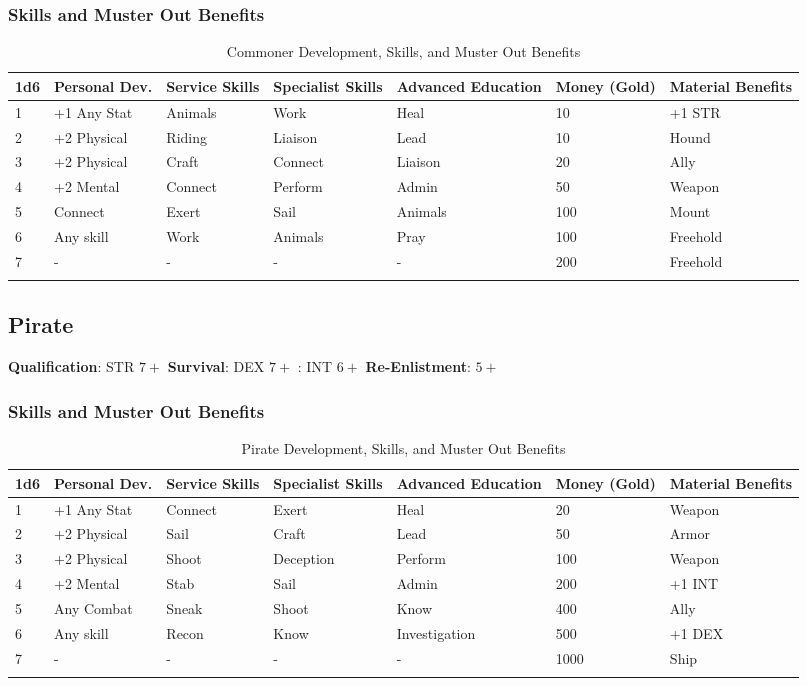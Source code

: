 \documentclass[itdr/core]{subfiles}
\begin{document}
\subsubsection{Skills and Muster Out Benefits}
\begin{longtable}{p{} p{} p{} p{} p{} p{} p{}}
\hline
\textbf{1d6} & \textbf{Personal Dev.} & \textbf{Service Skills} & \textbf{Specialist Skills} & \textbf{Advanced Education} & \textbf{Money (Gold)} & \textbf{Material Benefits} \\
\hline
1 & +1 Any Stat & Animals & Work & Heal & 10 & +1 STR \\
2 & +2 Physical & Riding & Liaison & Lead & 10 & Hound \\
3 & +2 Physical & Craft & Connect & Liaison & 20 & Ally \\
4 & +2 Mental & Connect & Perform & Admin & 50 & Weapon \\
5 & Connect & Exert & Sail & Animals & 100 & Mount \\
6 & Any skill & Work & Animals & Pray & 100 & Freehold \\
7 & - & - & - & - & 200 & Freehold \\
\hline
\caption{Commoner Development, Skills, and Muster Out Benefits}
\end{longtable}

\subsection{Pirate}
\textbf{Qualification}: STR $7+$
\textbf{Survival}: DEX $7+$
: INT $6+$
\textbf{Re-Enlistment}: $5+$
\subsubsection{Skills and Muster Out Benefits}
\begin{longtable}{p{} p{} p{} p{} p{} p{} p{}}
\hline
\textbf{1d6} & \textbf{Personal Dev.} & \textbf{Service Skills} & \textbf{Specialist Skills} & \textbf{Advanced Education} & \textbf{Money (Gold)} & \textbf{Material Benefits} \\
\hline
1 & +1 Any Stat & Connect & Exert & Heal & 20 & Weapon \\
2 & +2 Physical & Sail & Craft & Lead & 50 & Armor \\
3 & +2 Physical & Shoot & Deception & Perform & 100 & Weapon \\
4 & +2 Mental & Stab & Sail & Admin & 200 & +1 INT \\
5 & Any Combat & Sneak & Shoot & Know & 400 & Ally \\
6 & Any skill & Recon & Know & Investigation & 500 & +1 DEX \\
7 & - & - & - & - & 1000 & Ship \\
\hline
\caption{Pirate Development, Skills, and Muster Out Benefits}
\end{longtable}
\end{document}
